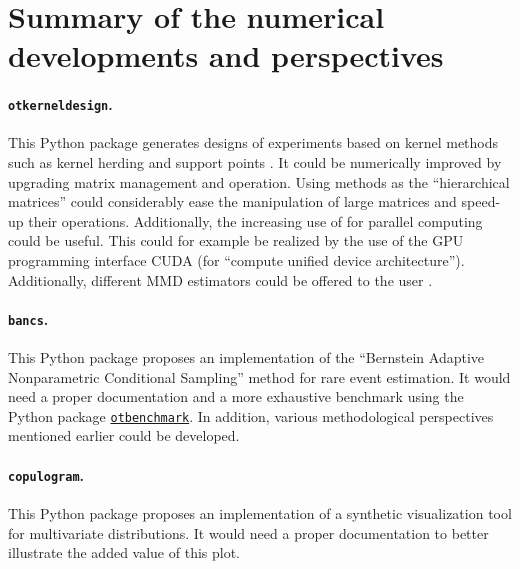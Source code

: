 \section*{Summary of the numerical developments and perspectives}

\paragraph{\texttt{otkerneldesign}.}
This Python package generates designs of experiments based on kernel methods such as kernel herding \citep{chen_2018_owt_diagram} and support points \citep{mak_joseph_2018}. 
It could be numerically improved by upgrading matrix management and operation. 
Using methods as the ``hierarchical matrices'' \citep{borm_2003_hmat} could considerably ease the manipulation of large matrices and speed-up their operations.  
Additionally, the increasing use of  for parallel computing could be useful. 
This could for example be realized by the use of the GPU programming interface CUDA (for ``compute unified device architecture''). 
Additionally, different MMD estimators could be offered to the user \citep{gretton_2006}. 


\paragraph{\texttt{bancs}.}
This Python package proposes an implementation of the ``Bernstein Adaptive Nonparametric Conditional Sampling'' method for rare event estimation. 
It would need a proper documentation and a more exhaustive benchmark using the Python package \href{https://github.com/mbaudin47/otbenchmark/}{\texttt{otbenchmark}}\footnotemark. 
In addition, various methodological perspectives mentioned earlier could be developed. 


\paragraph{\texttt{copulogram}.}
This Python package proposes an implementation of a synthetic visualization tool for multivariate distributions. 
It would need a proper documentation to better illustrate the added value of this plot. 

